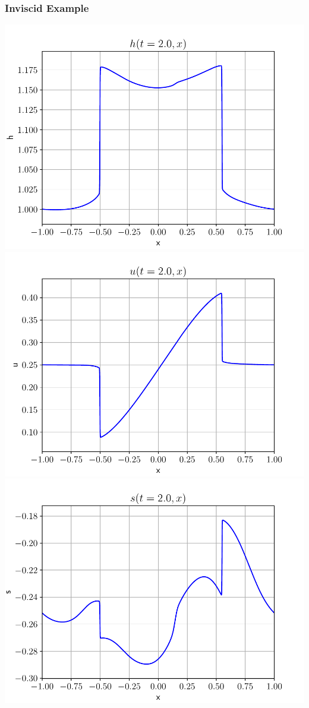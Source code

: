 \documentclass[10pt]{beamer}
\begin{document}
      \begin{frame}
        \frametitle{Inviscid Example}
        \includegraphics[scale=0.2]{Figures/h_10.pdf}
        \includegraphics[scale=0.2]{Figures/u_10.pdf}
        \includegraphics[scale=0.2]{Figures/s_10.pdf}

\end{frame}
\end{document}
